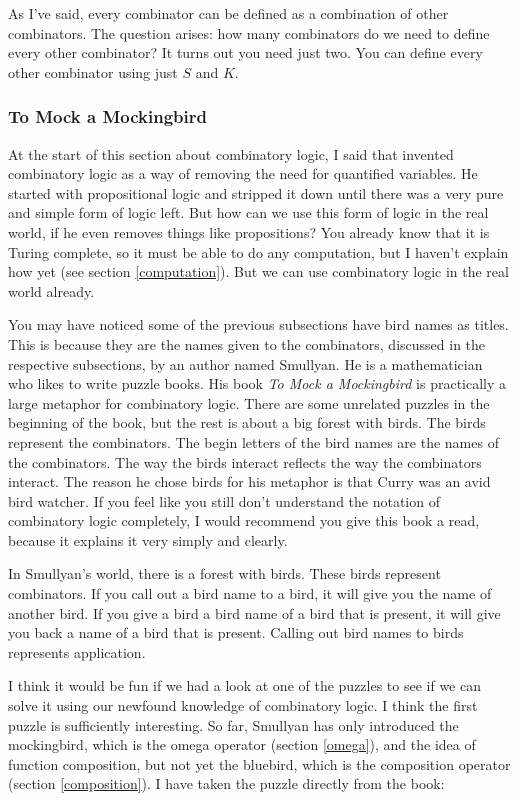 \documentclass[11pt]{article}
\begin{document}
As I've said, every combinator can be defined as a combination of other
combinators. The question arises: how many combinators do we need to define
every other combinator? It turns out you need just two. You can define every
other combinator using just \(S\) and \(K\).

\subsubsection{To Mock a Mockingbird}

At the start of this section about combinatory logic, I said that
\textcite{schonfinkel1924} invented combinatory logic as a way of removing the
need for quantified variables. He started with propositional logic and stripped
it down until there was a very pure and simple form of logic left. But how can
we use this form of logic in the real world, if he even removes things like
propositions? You already know that it is Turing complete, so it must be able
to do any computation, but I haven't explain how yet (see section
\ref{computation}). But we can use combinatory logic in the real world already.

You may have noticed some of the previous subsections have bird names as
titles. This is because they are the names given to the combinators, discussed
in the respective subsections, by an author named Smullyan. He is a
mathematician who likes to write puzzle books. His book \emph{To Mock a
Mockingbird} \parencite{smullyan2000} is practically a large metaphor for
combinatory logic. There are some unrelated puzzles in the beginning of the
book, but the rest is about a big forest with birds. The birds represent the
combinators. The begin letters of the bird names are the names of the
combinators. The way the birds interact reflects the way the combinators
interact. The reason he chose birds for his metaphor is that Curry was an avid
bird watcher. If you feel like you still don't understand the notation of
combinatory logic completely, I would recommend you give this book a read,
because it explains it very simply and clearly.

In Smullyan's world, there is a forest with birds. These birds represent
combinators. If you call out a bird name to a bird, it will give you the name
of another bird. If you give a bird a bird name of a bird that is present, it
will give you back a name of a bird that is present. Calling out bird names to
birds represents application.

I think it would be fun if we had a look at one of the puzzles to see if we can
solve it using our newfound knowledge of combinatory logic. I think the first
puzzle is sufficiently interesting. So far, Smullyan has only introduced the
mockingbird, which is the omega operator (section \ref{omega}), and the idea of
function composition, but not yet the bluebird, which is the composition
operator (section \ref{composition}). I have taken the puzzle directly from the
book:
\end{document}
